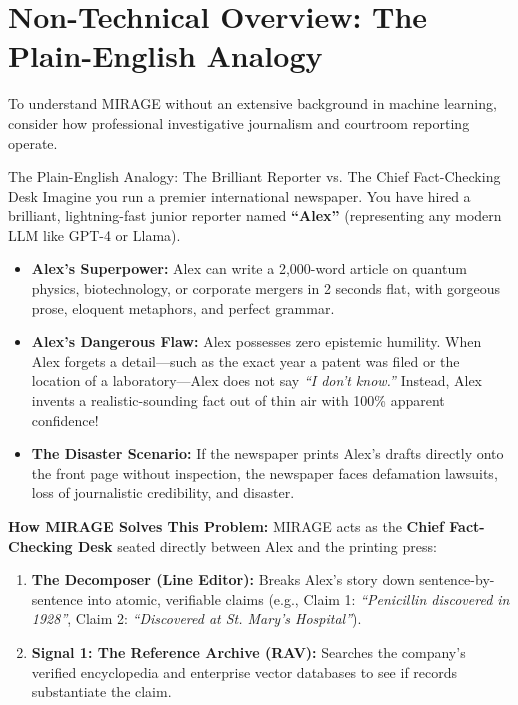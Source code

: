 \documentclass[11pt,a4paper]{article}
\begin{document}
\section{Non-Technical Overview: The Plain-English Analogy}

To understand MIRAGE without an extensive background in machine learning, consider how professional investigative journalism and courtroom reporting operate.

\begin{analogybox}{The Plain-English Analogy: The Brilliant Reporter vs. The Chief Fact-Checking Desk}
Imagine you run a premier international newspaper. You have hired a brilliant, lightning-fast junior reporter named \textbf{``Alex''} (representing any modern LLM like GPT-4 or Llama). 
\begin{itemize}[leftmargin=*]
    \item \textbf{Alex's Superpower:} Alex can write a 2,000-word article on quantum physics, biotechnology, or corporate mergers in 2 seconds flat, with gorgeous prose, eloquent metaphors, and perfect grammar.
    \item \textbf{Alex's Dangerous Flaw:} Alex possesses zero epistemic humility. When Alex forgets a detail---such as the exact year a patent was filed or the location of a laboratory---Alex does not say \textit{``I don't know.''} Instead, Alex invents a realistic-sounding fact out of thin air with 100\% apparent confidence!
    \item \textbf{The Disaster Scenario:} If the newspaper prints Alex's drafts directly onto the front page without inspection, the newspaper faces defamation lawsuits, loss of journalistic credibility, and disaster.
\end{itemize}
\textbf{How MIRAGE Solves This Problem:}
MIRAGE acts as the \textbf{Chief Fact-Checking Desk} seated directly between Alex and the printing press:
\begin{enumerate}[leftmargin=*]
    \item \textbf{The Decomposer (Line Editor):} Breaks Alex's story down sentence-by-sentence into atomic, verifiable claims (e.g., Claim 1: \textit{``Penicillin discovered in 1928''}, Claim 2: \textit{``Discovered at St. Mary's Hospital''}).
    \item \textbf{Signal 1: The Reference Archive (RAV):} Searches the company's verified encyclopedia and enterprise vector databases to see if records substantiate the claim.

\end{enumerate}
\end{analogybox}
\end{document}
